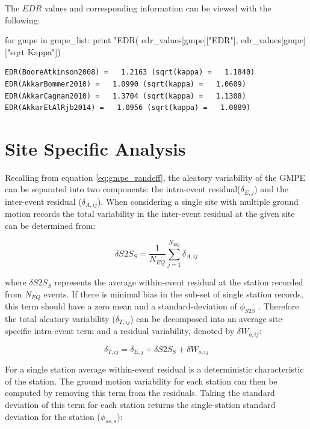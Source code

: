 The $EDR$ values and corresponding information can be viewed with the following:

\begin{python}
for gmpe in gmpe_list:
    print "EDR(%
        edr_values[gmpe]["EDR"], edr_values[gmpe]["sqrt Kappa"])
\end{python}

\begin{verbatim}
EDR(BooreAtkinson2008) =   1.2163 (sqrt(kappa) =   1.1840)
EDR(AkkarBommer2010) =   1.0990 (sqrt(kappa) =   1.0609)
EDR(AkkarCagnan2010) =   1.3704 (sqrt(kappa) =   1.1308)
EDR(AkkarEtAlRjb2014) =   1.0956 (sqrt(kappa) =   1.0889)
\end{verbatim}

\section{Site Specific Analysis}
\label{sec:site}

Recalling from equation \ref{eq:gmpe_randeff}, the aleatory variability of the GMPE can be separated into two components: the intra-event residual($\delta_{E,j}$) and the inter-event residual ($\delta_{A,ij}$). When considering a single site with multiple ground motion records the total variability in the inter-event residual at the given site can be determined from:

\begin{equation}
\delta S2S_S = \frac{1}{N_{EQ}} \sum\limits_{j = 1}^{N_{EQ}} \delta_{A,ij}
\end{equation}

\noindent where $\delta S2S_S$ represents the average within-event residual at the station recorded from $N_{EQ}$ events. If there is minimal bias in the sub-set of single station records, this term should have a zero mean and a standard-deviation of $\phi_{S2S}$ \citep{RodriguezMarek_etal2011}. Therefore the total aleatory variability ($\delta_{T,ij}$) can be decomposed into an average site-specific intra-event term and a residual variability, denoted by $\delta W_{o,ij}$:

\begin{equation}
\delta_{T,ij} = \delta_{E,j} + \delta S2S_S + \delta W_{o,ij}
\end{equation}

For a single station average within-event residual is a deterministic characteristic of the station. The ground motion variability for each station can then be computed by removing this term from the residuals. Taking the standard deviation of this term for each station returns the single-station standard deviation for the station ($\phi_{ss,s}$):

